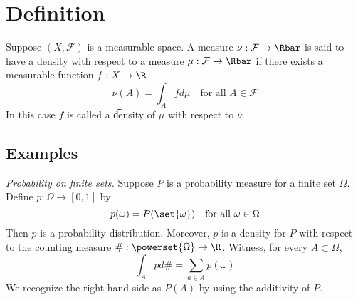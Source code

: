 

\section*{Definition}

Suppose $(X, \mathcal{F} )$ is a measurable space.
A measure $\nu : \mathcal{F}  \to \Rbar$ is said to have a density with respect to a measure $\mu : \mathcal{F}  \to \Rbar$ if there exists a measurable function $f: X \to \R _+$
\[
\nu (A) = \int _A f d\mu  \quad \text{for all } A \in \mathcal{F}
\]
In this case $f$ is called a \t{density} of $\mu $ with respect to $\nu $.

\subsection*{Examples}

\textit{Probability on finite sets.}
Suppose $P$ is a probability measure for a finite set $\Omega $.
Define $p: \Omega  \to [0,1]$ by
\[
p(\omega ) = P(\set{\omega }) \quad \text{for all } \omega  \in \Omega
\]
Then $p$ is a probability distribution.
Moreover, $p$ is a density for $P$ with respect to the counting measure $\#: \powerset{\Omega } \to \R $.
Witness, for every $A \subset \Omega $,
\[
\int_{A} p d\# = \sum_{a \in A} p(\omega )
\]
We recognize the right hand side as $P(A)$ by using the additivity of $P$.

\blankpage